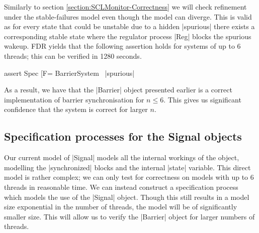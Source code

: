 Similarly to section \ref{section:SCLMonitor-Correctness} we will check refinement under the stable-failures model even though the model can diverge. This is valid as for every state that could be unstable due to a hidden |spurious| there exists a corresponding stable state where the regulator process |Reg| blocks the spurious wakeup.
FDR yields that the following assertion holds for systems of up to 6 threads; this can be verified in 1280 seconds.

\begin{cspm}
assert Spec [F= BarrierSystem \ {|spurious|}
\end{cspm}

As a result, we have that the |Barrier| object presented earlier is a correct implementation of barrier synchronisation for $n \leq 6$. This gives us significant confidence that the system is correct for larger $n$.

\subsection{Specification processes for the Signal objects}%

Our current model of |Signal| models all the internal workings of the object, modelling the |synchronized| blocks and the internal |state| variable. This direct model is rather complex; we can only test for correctness on models with up to 6 threads in reasonable time.
We can instead construct a specification process which models the use of the |Signal| object. Though this still results in a model size exponential in the number of threads, the model will be of significantly smaller size. This will allow us to verify the |Barrier| object for larger numbers of threads.

